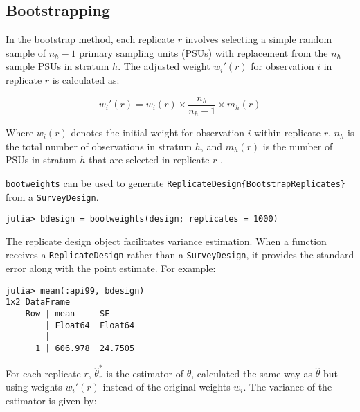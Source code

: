 \documentclass{juliacon}
\begin{document}
\subsection{Bootstrapping}



In the bootstrap method, each replicate \( r \) involves selecting a simple random sample of \( n_h - 1 \) primary sampling units (PSUs) with replacement from the \( n_h \) sample PSUs in stratum \( h \). The adjusted weight \( w_i'(r) \) for observation \( i \) in replicate \( r \) is calculated as:



\begin{equation}
    w_i'(r) = w_i(r) \times \frac{n_h}{n_h - 1} \times m_{h}(r)
\end{equation}

Where \( w_i(r) \) denotes the initial weight for observation \( i \) within replicate \( r \), \( n_h \) is the total number of observations in stratum \( h \), and \( m_{h}(r) \) is the number of PSUs in stratum \( h \) that are selected in replicate \( r \) \cite{Lohr}.

\verb|bootweights| can be used to generate \verb|ReplicateDesign{BootstrapReplicates}| from a \verb|SurveyDesign|. 

\begin{lstlisting}
julia> bdesign = bootweights(design; replicates = 1000)
\end{lstlisting}




The replicate design object facilitates variance estimation. When a function receives a \verb|ReplicateDesign| rather than a \verb|SurveyDesign|, it provides the standard error along with the point estimate.
For example: 
\begin{lstlisting}
julia> mean(:api99, bdesign)
1x2 DataFrame
    Row | mean     SE      
        | Float64  Float64 
--------|-----------------
      1 | 606.978  24.7505
    \end{lstlisting}
For each replicate $r$, $\hat{\theta}^*_r$ is the estimator of $\theta$, calculated the same way as $\hat{\theta}$ but using weights $w_i'(r)$ instead of the original weights $w_i$. The variance of the estimator is given by: 
\end{document}
